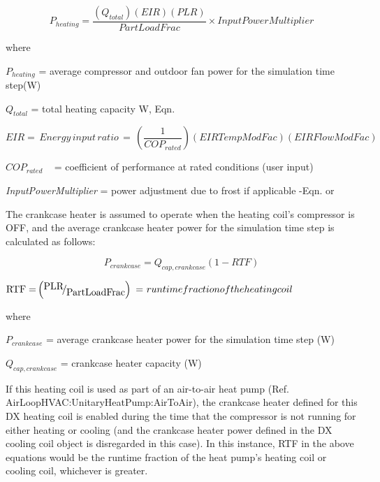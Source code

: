 \begin{equation}
  P_{heating} = \frac{{\left( {{Q_{total}}} \right)\left( {EIR} \right)\left( {PLR} \right)}}{{PartLoadFrac}} \times InputPowerMultiplier
\end{equation}

where

\({P_{heating}}\) = average compressor and outdoor fan power for the simulation time step(W)

\({Q_{total}}\) = total heating capacity W, Eqn.

\begin{equation}
  EIR = \,Energy\,input\,ratio\, = \,\left( {\frac{1}{{CO{P_{rated}}}}} \right)\left( {EIRTempModFac} \right)\left( {EIRFlowModFac} \right)
\end{equation}

\(CO{P_{rated}}\) ~ = coefficient of performance at rated conditions (user input)

\emph{InputPowerMultiplier} = power adjustment due to frost if applicable -Eqn. or

The crankcase heater is assumed to operate when the heating coil's compressor is OFF, and the average crankcase heater power for the simulation time step is calculated as follows:

\begin{equation}
  {P_{crankcase}} = {Q_{cap,crankcase}}\left( {1 - RTF} \right)
\end{equation}

\({\rm{RTF = }}\left( {{\raise0.7ex\hbox{{{\rm{PLR}}}} \!\mathord{\left/ {\vphantom {{{\rm{PLR}}} {{\rm{PartLoadFrac}}}}}\right.}\!\lower0.7ex\hbox{{{\rm{PartLoadFrac}}}}}} \right)\,\,{\rm{ = }}\,\,runtime fraction of the heating coil\)

where

\({P_{crankcase}}\) = average crankcase heater power for the simulation time step (W)

\({Q_{cap,crankcase}}\) = crankcase heater capacity (W)

If this heating coil is used as part of an air-to-air heat pump (Ref. AirLoopHVAC:UnitaryHeatPump:AirToAir), the crankcase heater defined for this DX heating coil is enabled during the time that the compressor is not running for either heating or cooling (and the crankcase heater power defined in the DX cooling coil object is disregarded in this case). In this instance, RTF in the above equations would be the runtime fraction of the heat pump's heating coil or cooling coil, whichever is greater.

